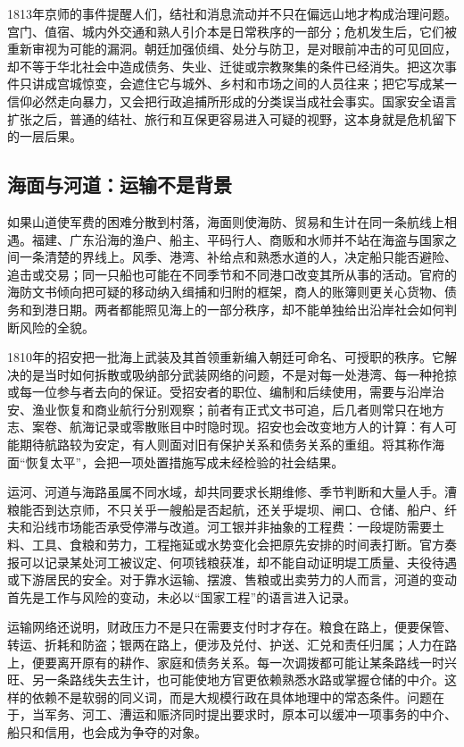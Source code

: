1813年京师的事件提醒人们，结社和消息流动并不只在偏远山地才构成治理问题。宫门、值宿、城内外交通和熟人引介本是日常秩序的一部分；危机发生后，它们被重新审视为可能的漏洞。朝廷加强侦缉、处分与防卫，是对眼前冲击的可见回应，却不等于华北社会中造成债务、失业、迁徙或宗教聚集的条件已经消失。把这次事件只讲成宫城惊变，会遮住它与城外、乡村和市场之间的人员往来；把它写成某一信仰必然走向暴力，又会把行政追捕所形成的分类误当成社会事实。国家安全语言扩张之后，普通的结社、旅行和互保更容易进入可疑的视野，这本身就是危机留下的一层后果。

\subsection{海面与河道：运输不是背景}

如果山道使军费的困难分散到村落，海面则使海防、贸易和生计在同一条航线上相遇。福建、广东沿海的渔户、船主、平码行人、商贩和水师并不站在海盗与国家之间一条清楚的界线上。风季、港湾、补给点和熟悉水道的人，决定船只能否避险、追击或交易；同一只船也可能在不同季节和不同港口改变其所从事的活动。官府的海防文书倾向把可疑的移动纳入缉捕和归附的框架，商人的账簿则更关心货物、债务和到港日期。两者都能照见海上的一部分秩序，却不能单独给出沿岸社会如何判断风险的全貌。

1810年的招安把一批海上武装及其首领重新编入朝廷可命名、可授职的秩序。它解决的是当时如何拆散或吸纳部分武装网络的问题，不是对每一处港湾、每一种抢掠或每一位参与者去向的保证。受招安者的职位、编制和后续使用，需要与沿岸治安、渔业恢复和商业航行分别观察；前者有正式文书可追，后几者则常只在地方志、案卷、航海记录或零散账目中时隐时现。招安也会改变地方人的计算：有人可能期待航路较为安定，有人则面对旧有保护关系和债务关系的重组。将其称作海面“恢复太平”，会把一项处置措施写成未经检验的社会结果。

运河、河道与海路虽属不同水域，却共同要求长期维修、季节判断和大量人手。漕粮能否到达京师，不只关乎一艘船是否起航，还关乎堤坝、闸口、仓储、船户、纤夫和沿线市场能否承受停滞与改道。河工银并非抽象的工程费：一段堤防需要土料、工具、食粮和劳力，工程拖延或水势变化会把原先安排的时间表打断。官方奏报可以记录某处河工被议定、何项钱粮获准，却不能自动证明堤工质量、夫役待遇或下游居民的安全。对于靠水运输、摆渡、售粮或出卖劳力的人而言，河道的变动首先是工作与风险的变动，未必以“国家工程”的语言进入记录。

运输网络还说明，财政压力不是只在需要支付时才存在。粮食在路上，便要保管、转运、折耗和防盗；银两在路上，便涉及兑付、护送、汇兑和责任归属；人力在路上，便要离开原有的耕作、家庭和债务关系。每一次调拨都可能让某条路线一时兴旺、另一条路线失去生计，也可能使地方官更依赖熟悉水路或掌握仓储的中介。这样的依赖不是软弱的同义词，而是大规模行政在具体地理中的常态条件。问题在于，当军务、河工、漕运和赈济同时提出要求时，原本可以缓冲一项事务的中介、船只和信用，也会成为争夺的对象。


